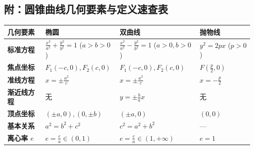 \documentclass[11pt,a4paper]{ctexart}
\begin{document}
\subsection*{附：圆锥曲线几何要素与定义速查表}
\begin{tabularx}{\textwidth}{l|X|X|X}
\toprule
\textbf{几何要素} & \textbf{椭圆} & \textbf{双曲线} & \textbf{抛物线} \\
\midrule
\textbf{标准方程} & $\frac{x^2}{a^2} + \frac{y^2}{b^2} = 1$ ($a>b>0$) & $\frac{x^2}{a^2} - \frac{y^2}{b^2} = 1$ ($a>0, b>0$) & $y^2 = 2px$ ($p>0$) \\ \hline
\textbf{焦点坐标} & $F_1(-c,0), F_2(c,0)$ & $F_1(-c,0), F_2(c,0)$ & $F\left(\frac{p}{2},0\right)$ \\ \hline
\textbf{准线方程} & $x = \pm\frac{a^2}{c}$ & $x = \pm\frac{a^2}{c}$ & $x = -\frac{p}{2}$ \\ \hline
\textbf{渐近线方程} & 无 & $y = \pm\frac{b}{a}x$ & 无 \\ \hline
\textbf{顶点坐标} & $(\pm a, 0), (0, \pm b)$ & $(\pm a, 0)$ & $(0,0)$ \\ \hline
\textbf{基本关系} & $a^2 = b^2 + c^2$ & $c^2 = a^2 + b^2$ & — \\ \hline
\textbf{离心率 $e$} & $e = \frac{c}{a} \in (0, 1)$ & $e = \frac{c}{a} \in (1, +\infty)$ & $e = 1$ \\
\bottomrule
\end{tabularx}
\vspace{0.8em}
\end{document}
